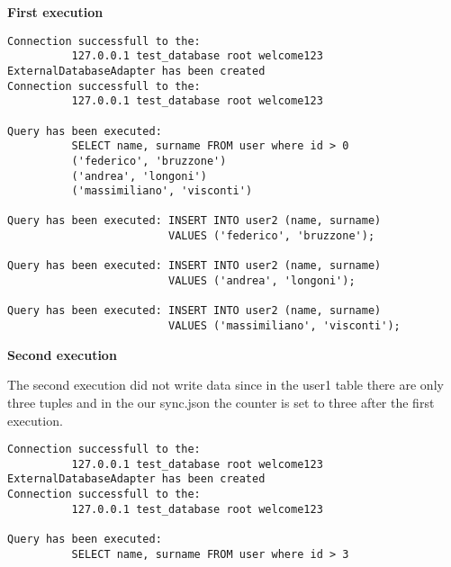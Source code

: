 \textbf{First execution}
\begin{lstlisting}
Connection successfull to the: 
          127.0.0.1 test_database root welcome123 
ExternalDatabaseAdapter has been created
Connection successfull to the: 
          127.0.0.1 test_database root welcome123 

Query has been executed: 
          SELECT name, surname FROM user where id > 0
          ('federico', 'bruzzone')
          ('andrea', 'longoni')
          ('massimiliano', 'visconti')

Query has been executed: INSERT INTO user2 (name, surname) 
                         VALUES ('federico', 'bruzzone');

Query has been executed: INSERT INTO user2 (name, surname) 
                         VALUES ('andrea', 'longoni');

Query has been executed: INSERT INTO user2 (name, surname) 
                         VALUES ('massimiliano', 'visconti');
\end{lstlisting}


\textbf{Second execution}

The second execution did not write data since in the user1 table there are only three tuples and in the our sync.json the counter is set to three after the first execution.

\begin{lstlisting}
Connection successfull to the: 
          127.0.0.1 test_database root welcome123 
ExternalDatabaseAdapter has been created
Connection successfull to the: 
          127.0.0.1 test_database root welcome123 

Query has been executed: 
          SELECT name, surname FROM user where id > 3
\end{lstlisting}
